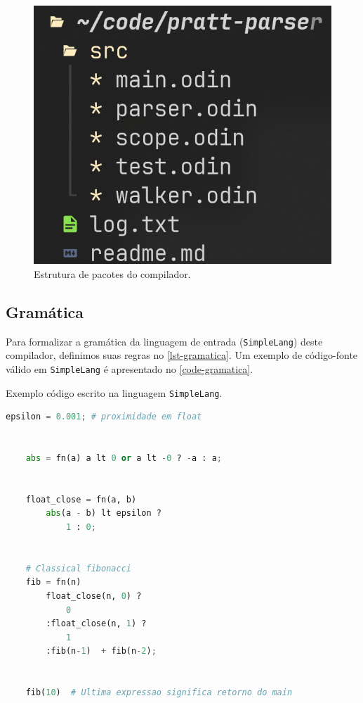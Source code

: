 \begin{figure}[H]
        \caption{\label{folder} \small Estrutura de pacotes do compilador.}
        \begin{center}
            \includegraphics[scale=0.5]{./Imagens/folder_structuer_odin_parser_lexer.png}
        \end{center}
\end{figure}


\subsection{Gramática}

Para formalizar a gramática da linguagem de entrada (\texttt{SimpleLang}) deste compilador, definimos suas regras no \autoref{lst-gramatica}. Um exemplo de código-fonte válido em \texttt{SimpleLang} é apresentado no \autoref{code-gramatica}.


\begin{codigo}[htb]
        \caption{\small Exemplo código escrito na linguagem \texttt{SimpleLang}. }
        \label{code-gramatica}
  \begin{lstlisting}[language = python]
    epsilon = 0.001; # proximidade em float


    abs = fn(a) a lt 0 or a lt -0 ? -a : a;


    float_close = fn(a, b) 
        abs(a - b) lt epsilon ? 
            1 : 0;


    # Classical fibonacci
    fib = fn(n)  
        float_close(n, 0) ? 
            0
        :float_close(n, 1) ?
            1
        :fib(n-1)  + fib(n-2);


    fib(10)  # Ultima expressao significa retorno do main
  \end{lstlisting}
\end{codigo}

